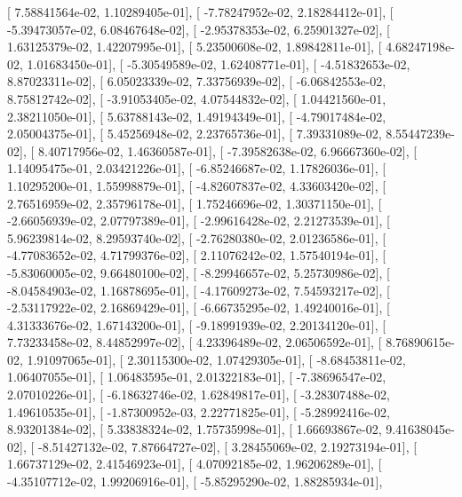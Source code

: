 \documentclass{article}
\begin{document}
       [  7.58841564e-02,   1.10289405e-01],
       [ -7.78247952e-02,   2.18284412e-01],
       [ -5.39473057e-02,   6.08467648e-02],
       [ -2.95378353e-02,   6.25901327e-02],
       [  1.63125379e-02,   1.42207995e-01],
       [  5.23500608e-02,   1.89842811e-01],
       [  4.68247198e-02,   1.01683450e-01],
       [ -5.30549589e-02,   1.62408771e-01],
       [ -4.51832653e-02,   8.87023311e-02],
       [  6.05023339e-02,   7.33756939e-02],
       [ -6.06842553e-02,   8.75812742e-02],
       [ -3.91053405e-02,   4.07544832e-02],
       [  1.04421560e-01,   2.38211050e-01],
       [  5.63788143e-02,   1.49194349e-01],
       [ -4.79017484e-02,   2.05004375e-01],
       [  5.45256948e-02,   2.23765736e-01],
       [  7.39331089e-02,   8.55447239e-02],
       [  8.40717956e-02,   1.46360587e-01],
       [ -7.39582638e-02,   6.96667360e-02],
       [  1.14095475e-01,   2.03421226e-01],
       [ -6.85246687e-02,   1.17826036e-01],
       [  1.10295200e-01,   1.55998879e-01],
       [ -4.82607837e-02,   4.33603420e-02],
       [  2.76516959e-02,   2.35796178e-01],
       [  1.75246696e-02,   1.30371150e-01],
       [ -2.66056939e-02,   2.07797389e-01],
       [ -2.99616428e-02,   2.21273539e-01],
       [  5.96239814e-02,   8.29593740e-02],
       [ -2.76280380e-02,   2.01236586e-01],
       [ -4.77083652e-02,   4.71799376e-02],
       [  2.11076242e-02,   1.57540194e-01],
       [ -5.83060005e-02,   9.66480100e-02],
       [ -8.29946657e-02,   5.25730986e-02],
       [ -8.04584903e-02,   1.16878695e-01],
       [ -4.17609273e-02,   7.54593217e-02],
       [ -2.53117922e-02,   2.16869429e-01],
       [ -6.66735295e-02,   1.49240016e-01],
       [  4.31333676e-02,   1.67143200e-01],
       [ -9.18991939e-02,   2.20134120e-01],
       [  7.73233458e-02,   8.44852997e-02],
       [  4.23396489e-02,   2.06506592e-01],
       [  8.76890615e-02,   1.91097065e-01],
       [  2.30115300e-02,   1.07429305e-01],
       [ -8.68453811e-02,   1.06407055e-01],
       [  1.06483595e-01,   2.01322183e-01],
       [ -7.38696547e-02,   2.07010226e-01],
       [ -6.18632746e-02,   1.62849817e-01],
       [ -3.28307488e-02,   1.49610535e-01],
       [ -1.87300952e-03,   2.22771825e-01],
       [ -5.28992416e-02,   8.93201384e-02],
       [  5.33838324e-02,   1.75735998e-01],
       [  1.66693867e-02,   9.41638045e-02],
       [ -8.51427132e-02,   7.87664727e-02],
       [  3.28455069e-02,   2.19273194e-01],
       [  1.66737129e-02,   2.41546923e-01],
       [  4.07092185e-02,   1.96206289e-01],
       [ -4.35107712e-02,   1.99206916e-01],
       [ -5.85295290e-02,   1.88285934e-01],
\end{document}
